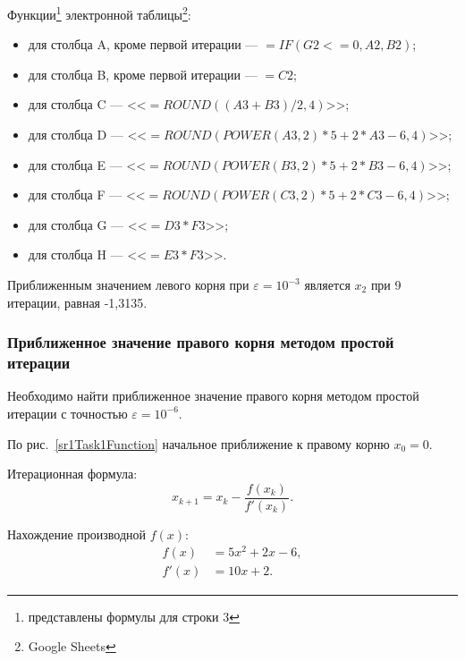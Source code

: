 \documentclass[10pt, a4paper, titlepage]{article}
\begin{document}
Функции\footnote{представлены формулы для строки 3} электронной таблицы\footnote{Google Sheets}:
\begin{itemize}
    \item для столбца A, кроме первой итерации --- $=IF(G2<=0, A2, B2)$;
    
    \item для столбца B, кроме первой итерации --- $=C2$;
    
    \item для столбца C --- <<$=ROUND((A3+B3)/2, 4)$>>;
    
    \item для столбца D --- <<$=ROUND(POWER(A3, 2)*5+2*A3-6, 4)$>>;
    
    \item для столбца E --- <<$=ROUND(POWER(B3, 2)*5+2*B3-6, 4)$>>;
    
    \item для столбца F --- <<$=ROUND(POWER(C3, 2)*5+2*C3-6, 4)$>>;
    
    \item для столбца G --- <<$=D3*F3$>>;
    
    \item для столбца H --- <<$=E3*F3$>>.

\end{itemize}

Приближенным значением левого корня при $\varepsilon=10^{-3}$ является $x_2$ при 9 итерации, равная -1,3135.

\subsubsection*{Приближенное значение правого корня методом простой итерации}

Необходимо найти приближенное значение правого корня методом простой итерации с точностью $\varepsilon=10^{-6}$.

По рис.~\ref{sr1Task1Function} начальное приближение к правому корню $x_0=0$.

Итерационная формула: $$x_{k+1}=x_k-\frac{f(x_k)}{f'(x_k)} .$$

Нахождение производной $f(x)$:
\begin{align*}
    f(x) &= 5x^2+2x-6, \\
    f'(x) &= 10x+2.
\end{align*}
\end{document}
